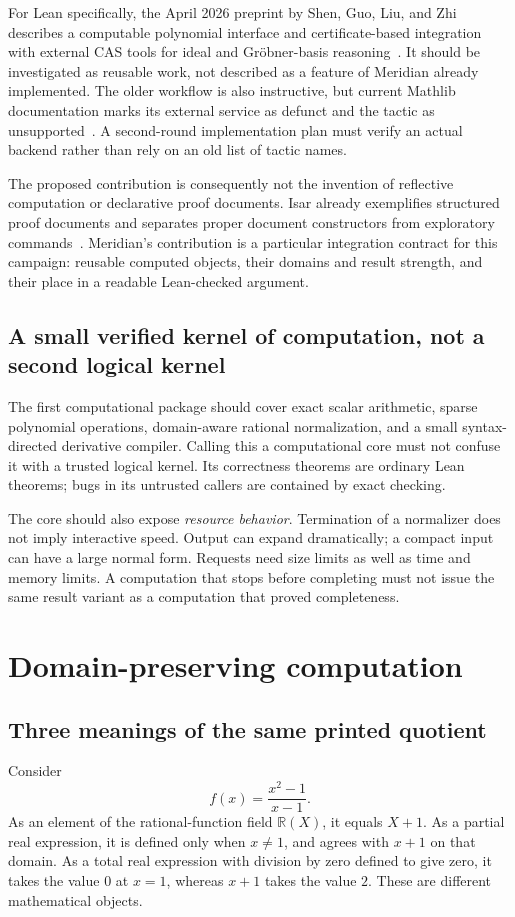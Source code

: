 \documentclass[11pt,a4paper]{article}
\newcommand{\code}[1]{\texttt{\detokenize{#1}}}
\newcommand{\R}{\mathbb R}
\theoremstyle{remark}
\begin{document}
For Lean specifically, the April 2026 preprint by Shen, Guo, Liu, and Zhi describes
a computable polynomial interface and certificate-based integration with external
CAS tools for ideal and Gr\"obner-basis reasoning~\cite{shen}. It should be
investigated as reusable work, not described as a feature of Meridian already
implemented. The older \code{polyrith} workflow is also instructive, but current
Mathlib documentation marks its external service as defunct and the tactic as
unsupported~\cite{polyrith}. A second-round implementation plan must verify an
actual backend rather than rely on an old list of tactic names.

The proposed contribution is consequently not the invention of reflective
computation or declarative proof documents. Isar already exemplifies structured
proof documents and separates proper document constructors from exploratory
commands~\cite{isar}. Meridian's contribution is a particular integration contract
for this campaign: reusable computed objects, their domains and result strength,
and their place in a readable Lean-checked argument.

\subsection{A small verified kernel of computation, not a second logical kernel}
The first computational package should cover exact scalar arithmetic, sparse
polynomial operations, domain-aware rational normalization, and a small
syntax-directed derivative compiler. Calling this a computational core must not
confuse it with a trusted logical kernel. Its correctness theorems are ordinary
Lean theorems; bugs in its untrusted callers are contained by exact checking.

The core should also expose \emph{resource behavior}. Termination of a normalizer
does not imply interactive speed. Output can expand dramatically; a compact
input can have a large normal form. Requests need size limits as well as time and
memory limits. A computation that stops before completing must not issue the
same result variant as a computation that proved completeness.

\section{Domain-preserving computation}
\label{sec:domains}
\subsection{Three meanings of the same printed quotient}
Consider
\[
 f(x)=\frac{x^2-1}{x-1}.
\]
As an element of the rational-function field $\R(X)$, it equals $X+1$.
As a partial real expression, it is defined only when $x\ne1$, and agrees with
$x+1$ on that domain. As a total real expression with division by zero defined
to give zero, it takes the value $0$ at $x=1$, whereas $x+1$ takes the value $2$.
These are different mathematical objects.
\end{document}
